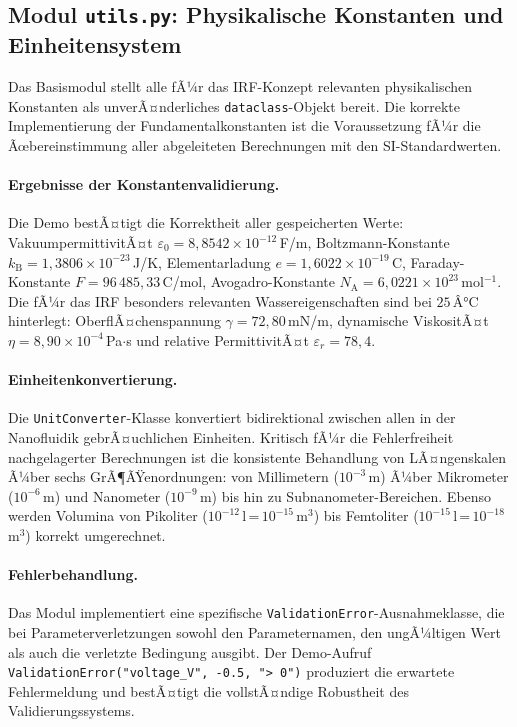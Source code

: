 ﻿\documentclass[a4paper,12pt]{scrreprt}
\theoremstyle{definition}
\begin{document}
\subsection{Modul \texttt{utils.py}: Physikalische Konstanten und Einheitensystem}

Das Basismodul stellt alle fÃ¼r das IRF-Konzept relevanten physikalischen
Konstanten als unverÃ¤nderliches \texttt{dataclass}-Objekt bereit. Die korrekte
Implementierung der Fundamentalkonstanten ist die Voraussetzung fÃ¼r die
Ãœbereinstimmung aller abgeleiteten Berechnungen mit den SI-Standardwerten.

\paragraph{Ergebnisse der Konstantenvalidierung.}
Die Demo bestÃ¤tigt die Korrektheit aller gespeicherten Werte:
VakuumpermittivitÃ¤t $\varepsilon_0 = 8{,}8542 \times 10^{-12}$\,F/m,
Boltzmann-Konstante $k_\text{B} = 1{,}3806 \times 10^{-23}$\,J/K,
Elementarladung $e = 1{,}6022 \times 10^{-19}$\,C,
Faraday-Konstante $F = 96\,485{,}33$\,C/mol,
Avogadro-Konstante $N_\text{A} = 6{,}0221 \times 10^{23}$\,mol$^{-1}$.
Die fÃ¼r das IRF besonders relevanten Wassereigenschaften sind bei $25\,Â°\text{C}$
hinterlegt: OberflÃ¤chenspannung $\gamma = 72{,}80$\,mN/m,
dynamische ViskositÃ¤t $\eta = 8{,}90 \times 10^{-4}$\,Pa$\cdot$s und
relative PermittivitÃ¤t $\varepsilon_r = 78{,}4$.

\paragraph{Einheitenkonvertierung.}
Die \texttt{UnitConverter}-Klasse konvertiert bidirektional zwischen allen in
der Nanofluidik gebrÃ¤uchlichen Einheiten. Kritisch fÃ¼r die Fehlerfreiheit
nachgelagerter Berechnungen ist die konsistente Behandlung von LÃ¤ngenskalen Ã¼ber
sechs GrÃ¶ÃŸenordnungen: von Millimetern ($10^{-3}$\,m) Ã¼ber Mikrometer ($10^{-6}$\,m)
und Nanometer ($10^{-9}$\,m) bis hin zu Subnanometer-Bereichen. Ebenso werden
Volumina von Pikoliter ($10^{-12}$\,l\,=\,$10^{-15}$\,m$^3$) bis Femtoliter
($10^{-15}$\,l\,=\,$10^{-18}$\,m$^3$) korrekt umgerechnet.

\paragraph{Fehlerbehandlung.}
Das Modul implementiert eine spezifische \texttt{ValidationError}-Ausnahmeklasse,
die bei Parameterverletzungen sowohl den Parameternamen, den ungÃ¼ltigen Wert als
auch die verletzte Bedingung ausgibt. Der Demo-Aufruf
\texttt{ValidationEr\newline ror("voltage\_V", -0.5, "> 0")} produziert die erwartete
Fehlermeldung und bestÃ¤tigt die vollstÃ¤ndige Robustheit des Validierungssystems.
\end{document}
